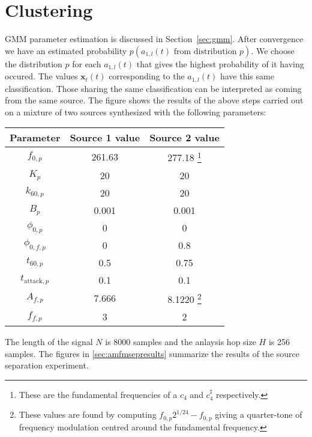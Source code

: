 \section{Clustering}
GMM parameter estimation is discussed in Section~\ref{sec:gmm}. After
convergence we have an estimated probability $p(a_{1,l}(t) \text{ from
distribution }p)$. We choose the distribution $p$ for each $a_{1,l}(t)$ that
gives the highest probability of it having occured. The values
$\mathbf{x}_{t}(t)$ corresponding to the $a_{1,l}(t)$ have this same
classification. Those sharing the same classification can be interpreted as
coming from the same source. The figure shows the results of the above steps
carried out on a mixture of two sources synthesized with the following
parameters:
\begin{table}
    \begin{center}
        \begin{tabular}{c c c }
            Parameter & Source 1 value & Source 2 value \\
            \hline
            $f_{0,p}$ & 261.63 & 277.18 \footnote{These are the fundamental
            frequencies of a $c_{4}$
            and $c_{4}^{\sharp}$ respectively.} \\
            $K_{p}$ & 20 & 20 \\
            $k_{60,p}$ & 20 & 20 \\
            $B_{p}$ & 0.001 & 0.001 \\
            $\phi_{0,p}$ & 0 & 0 \\
            $\phi_{0,f,p}$ & 0 & 0.8 \\
            $t_{60,p}$ & 0.5 & 0.75 \\
            $t_{\text{attack},p}$ & 0.1 & 0.1 \\
            $A_{f,p}$ & 7.666 & 8.1220 \footnote{These values are found by
            computing $f_{0,p}2^{1/24}-f_{0,p}$ giving a quarter-tone of
            frequency modulation centred around the fundamental frequency.} \\
            $f_{f,p}$ & 3 & 2
        \end{tabular}
    \end{center}
\end{table}
The length of the signal $N$ is 8000 samples and the anlaysis hop size $H$ is 256
samples. The figures in \ref{sec:amfmsepresults} summarize the results of the
source separation experiment.

